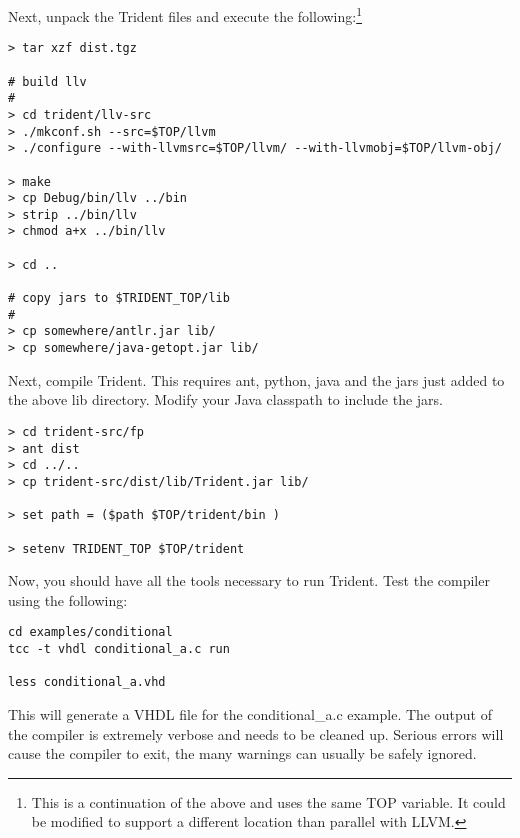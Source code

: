 Next, unpack the Trident files and execute the
following:\footnote{This is a continuation of the above and uses the
  same TOP variable.  It could be modified to support a different
  location than parallel with LLVM.}

\begin{verbatim}
> tar xzf dist.tgz

# build llv
# 
> cd trident/llv-src
> ./mkconf.sh --src=$TOP/llvm
> ./configure --with-llvmsrc=$TOP/llvm/ --with-llvmobj=$TOP/llvm-obj/

> make
> cp Debug/bin/llv ../bin
> strip ../bin/llv
> chmod a+x ../bin/llv

> cd ..

# copy jars to $TRIDENT_TOP/lib
#
> cp somewhere/antlr.jar lib/
> cp somewhere/java-getopt.jar lib/
\end{verbatim}

Next, compile Trident.  This requires ant, python, java and the jars
just added to the above lib directory.  Modify your Java classpath to
include the jars.

\begin{verbatim}
> cd trident-src/fp
> ant dist
> cd ../..
> cp trident-src/dist/lib/Trident.jar lib/

> set path = ($path $TOP/trident/bin )

> setenv TRIDENT_TOP $TOP/trident
\end{verbatim}

Now, you should have all the tools necessary to run Trident.  Test the 
compiler using the following:

\begin{verbatim}
cd examples/conditional
tcc -t vhdl conditional_a.c run

less conditional_a.vhd
\end{verbatim}

This will generate a VHDL file for the conditional\_a.c example.  The
output of the compiler is extremely verbose and needs to be cleaned up.
Serious errors will cause the compiler to exit, the many warnings can
usually be safely ignored.


